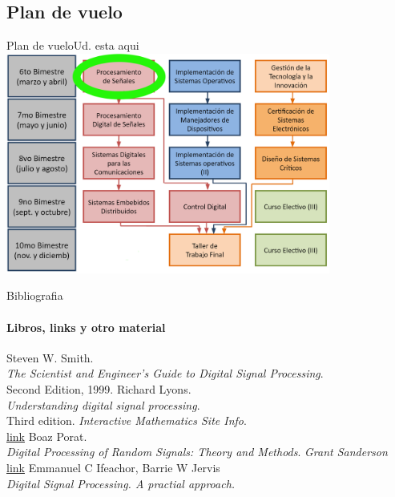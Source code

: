  \subsection{Plan de vuelo}
 \begin{frame}{Plan de vuelo}{Ud. esta aqui}
    \center\includegraphics[width=0.8\textwidth]{1_clase/Esquema_MSE}
    \vfill
 \end{frame}
    \begin{frame}{Bibliografia}
      \framesubtitle{Libros, links y otro material}
      \begin{thebibliography}{1}
            Steven W. Smith. \\
            \emph{The Scientist and Engineer's Guide to Digital Signal Processing}. \\
            Second Edition, 1999.
            Richard Lyons. \\
            \emph {Understanding digital signal processing}. \\
            Third edition.
            \emph{Interactive Mathematics Site Info}. \\
            \href {https://www.intmath.com/fourier-series/fourier-intro.php}{link}
             Boaz Porat. \\
            \emph{Digital Processing of Random Signals: Theory and Methods}.
            \emph{Grant Sanderson} \\
            \href{ https://youtu.be/spUNpyF58BY}{link}
             Emmanuel C Ifeachor, Barrie W Jervis \\
             \emph{ Digital Signal Processing. A practial approach.}
      \end{thebibliography}
    \end{frame}
